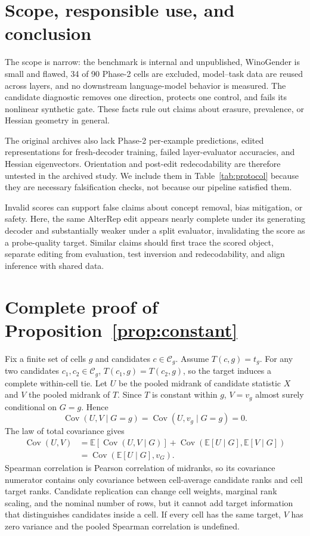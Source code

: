 \documentclass{article}
\begin{document}
\section{Scope, responsible use, and conclusion}

The scope is narrow: the benchmark is internal and unpublished, WinoGender is small and flawed, 34 of 90 Phase-2 cells are excluded, model--task data are reused across layers, and no downstream language-model behavior is measured. The candidate diagnostic removes one direction, protects one control, and fails its nonlinear synthetic gate. These facts rule out claims about erasure, prevalence, or Hessian geometry in general.

The original archives also lack Phase-2 per-example predictions, edited representations for fresh-decoder training, failed layer-evaluator accuracies, and Hessian eigenvectors. Orientation and post-edit redecodability are therefore untested in the archived study. We include them in Table~\ref{tab:protocol} because they are necessary falsification checks, not because our pipeline satisfied them.

Invalid scores can support false claims about concept removal, bias mitigation, or safety. Here, the same AlterRep edit appears nearly complete under its generating decoder and substantially weaker under a split evaluator, invalidating the score as a probe-quality target. Similar claims should first trace the scored object, separate editing from evaluation, test inversion and redecodability, and align inference with shared data.

\clearpage



\clearpage
\appendix

\section{Complete proof of Proposition~\ref{prop:constant}}
\label{app:proof}

Fix a finite set of cells $g$ and candidates $c\in\mathcal C_g$. Assume $T(c,g)=t_g$. For any two candidates $c_1,c_2\in\mathcal C_g$, $T(c_1,g)=T(c_2,g)$, so the target induces a complete within-cell tie. Let $U$ be the pooled midrank of candidate statistic $X$ and $V$ the pooled midrank of $T$. Since $T$ is constant within $g$, $V=v_g$ almost surely conditional on $G=g$. Hence
\[
\operatorname{Cov}(U,V\mid G=g)
=\operatorname{Cov}(U,v_g\mid G=g)=0.
\]
The law of total covariance gives
\begin{align*}
\operatorname{Cov}(U,V)
&=\mathbb E[\operatorname{Cov}(U,V\mid G)]
+\operatorname{Cov}(\mathbb E[U\mid G],\mathbb E[V\mid G])\\
&=\operatorname{Cov}(\mathbb E[U\mid G],v_G).
\end{align*}
Spearman correlation is Pearson correlation of midranks, so its covariance numerator contains only covariance between cell-average candidate ranks and cell target ranks. Candidate replication can change cell weights, marginal rank scaling, and the nominal number of rows, but it cannot add target information that distinguishes candidates inside a cell. If every cell has the same target, $V$ has zero variance and the pooled Spearman correlation is undefined.
\end{document}
